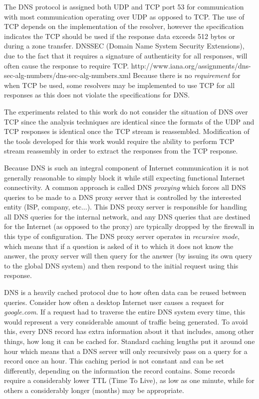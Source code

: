 \documentclass[12pt]{report}
\theoremstyle{remark}
\theoremstyle{definition}
\theoremstyle{definition}
\theoremstyle{definition}
\begin{document}
The DNS protocol is assigned both UDP and TCP port 53 for communication with
most communication operating over UDP as opposed to TCP. The use of TCP depends
on the implementation of the resolver, however the specification indicates the
TCP should be used if the response data exceeds 512 bytes or during a zone
transfer\cite{rfc1035}. DNSSEC (Domain Name System Security Extensions), due to
the fact that it requires a signature of authenticity for all responses, will
often cause the response to require TCP\cite{rfc4034}. %
http://www.iana.org/assignments/dns-sec-alg-numbers/dns-sec-alg-numbers.xml
Because there is no \emph{requirement} for when TCP be used, some resolvers may
be implemented to use TCP for all responses as this does not violate the
specifications for DNS.

The experiments related to this work do not consider the situation of DNS over
TCP since the analysis techniques are identical since the formats of the UDP and
TCP responses is identical once the TCP stream is reassembled. Modification of
the tools developed for this work would require the ability to perform TCP
stream reassembly in order to extract the responses from the TCP response.

Because DNS is such an integral component of Internet communication it is not
generally reasonable to simply block it while still expecting functional
Internet connectivity. A common approach is called DNS \emph{proxying} which
forces all DNS queries to be made to a DNS proxy server that is controlled by
the interested entity (ISP, company, etc...). This DNS proxy server is
responsible for handling all DNS queries for the internal network, and any DNS
queries that are destined for the Internet (as opposed to the proxy) are
typically dropped by the firewall in this type of configuration. The DNS proxy
server operates in \emph{recursive mode}, which means that if a question is
asked of it to which it does not know the answer, the proxy server will then
query for the answer (by issuing its own query to the global DNS system) and
then respond to the initial request using this response.

DNS is a heavily cached protocol due to how often data can be reused between
queries. Consider how often a desktop Internet user causes a request for
\emph{google.com}. If a request had to traverse the entire DNS system every
time, this would represent a very considerable amount of traffic being
generated. To avoid this, every DNS record has extra information about it that
includes, among other things, how long it can be cached for. Standard caching
lengths put it around one hour which means that a DNS server will only
recursively pass on a query for a record once an hour. This caching period is
not constant and can be set differently, depending on the information the record
contains. Some records require a considerably lower TTL (Time To Live), as low
as one minute, while for others a considerably longer (months) may be
appropriate.
\end{document}
